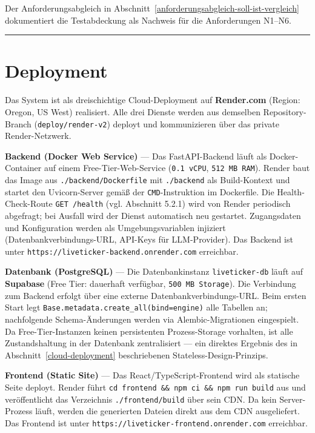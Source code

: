 Der Anforderungsabgleich in Abschnitt~\ref{anforderungsabgleich-soll-ist-vergleich} dokumentiert die Testabdeckung als Nachweis für die Anforderungen N1--N6.

\begin{center}\rule{0.5\linewidth}{0.5pt}\end{center}

\section{Deployment}\label{deployment}

Das System ist als dreischichtige Cloud-Deployment auf
\textbf{Render.com} (Region: Oregon, US West) realisiert. Alle drei
Dienste werden aus demselben Repository-Branch
(\texttt{deploy/render-v2}) deployt und kommunizieren über das private
Render-Netzwerk.

\textbf{Backend (Docker Web Service)} --- Das FastAPI-Backend läuft als
Docker-Container auf einem Free-Tier-Web-Service (\texttt{0.1\ vCPU},
\texttt{512\ MB\ RAM}). Render baut das Image aus
\texttt{./backend/Dockerfile} mit \texttt{./backend} als Build-Kontext
und startet den Uvicorn-Server gemäß der \texttt{CMD}-Instruktion im
Dockerfile. Die Health-Check-Route \texttt{GET\ /health} (vgl. Abschnitt
5.2.1) wird von Render periodisch abgefragt; bei Ausfall wird der Dienst
automatisch neu gestartet. Zugangsdaten und Konfiguration werden als
Umgebungsvariablen injiziert (Datenbankverbindungs-URL, API-Keys für
LLM-Provider). Das Backend ist unter
\texttt{https://liveticker-backend.onrender.com} erreichbar.

\textbf{Datenbank (PostgreSQL)} --- Die Datenbankinstanz
\texttt{liveticker-db} läuft auf \textbf{Supabase} (Free Tier:
dauerhaft verfügbar, \texttt{500~MB Storage}). Die Verbindung zum
Backend erfolgt über eine externe Datenbankverbindungs-URL. Beim ersten Start legt
\texttt{Base.metadata.create\_all(bind=engine)} alle Tabellen an;
nachfolgende Schema-Änderungen werden via Alembic-Migrationen
eingespielt. Da Free-Tier-Instanzen keinen persistenten Prozess-Storage
vorhalten, ist alle Zustandshaltung in der Datenbank zentralisiert ---
ein direktes Ergebnis des in Abschnitt~\ref{cloud-deployment} beschriebenen
Stateless-Design-Prinzips.

\textbf{Frontend (Static Site)} --- Das React/TypeScript-Frontend wird
als statische Seite deployt. Render führt
\texttt{cd\ frontend\ \&\&\ npm\ ci\ \&\&\ npm\ run\ build} aus und
veröffentlicht das Verzeichnis \texttt{./frontend/build} über sein CDN.
Da kein Server-Prozess läuft, werden die generierten Dateien direkt aus
dem CDN ausgeliefert. Das Frontend ist unter
\texttt{https://liveticker-frontend.onrender.com} erreichbar.

